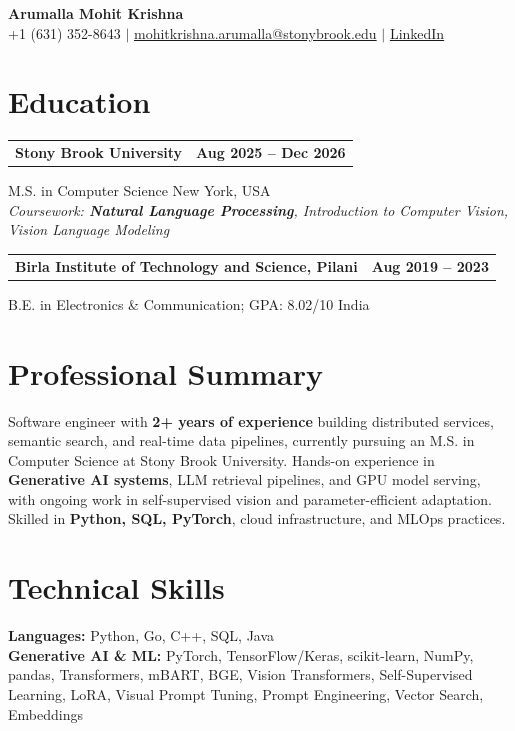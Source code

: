 \documentclass[letterpaper,10pt]{article}
\makeatletter
\newcommand{\entry}[2]{%
  \noindent
  \begin{tabularx}{\linewidth}
    {@{}>{\raggedright\arraybackslash}X@{\hspace{6pt}}r@{}}
    \textbf{#1} & #2
  \end{tabularx}\par
}
\makeatother
\begin{document}
\begin{center}
    {\LARGE\bfseries Arumalla Mohit Krishna}\\[3pt]
    +1 (631) 352-8643 $|$
    \href{mailto:mohitkrishna.arumalla@stonybrook.edu}
    {mohitkrishna.arumalla@stonybrook.edu} $|$
    \href{https://linkedin.com/in/mohit-krishna-arumalla}
    {LinkedIn}
\end{center}
\vspace{-8pt}

\section{Education}

\entry
  {\textbf{Stony Brook University}}
  {\textbf{Aug 2025 -- Dec 2026}}

M.S. in Computer Science \hfill New York, USA\\
\textit{
Coursework: \textbf{Natural Language Processing},
Introduction to Computer Vision, Vision Language Modeling
}
\vspace{3pt}

\entry
  {\textbf{Birla Institute of Technology and Science, Pilani}}
  {\textbf{Aug 2019 -- 2023}}

B.E. in Electronics \& Communication; GPA: 8.02/10 \hfill India
\section{Professional Summary}

Software engineer with \textbf{2+ years of experience} building distributed services,
semantic search, and real-time data pipelines, currently pursuing an M.S. in Computer
Science at Stony Brook University. Hands-on experience in \textbf{Generative AI systems}, LLM
retrieval pipelines, and GPU model serving, with ongoing work in self-supervised vision and
parameter-efficient adaptation. Skilled in \textbf{Python, SQL, PyTorch}, cloud infrastructure,
and MLOps practices.

\section{Technical Skills}

\textbf{Languages:}
Python, Go, C++, SQL, Java\\

\textbf{Generative AI \& ML:}
PyTorch, TensorFlow/Keras, scikit-learn, NumPy, pandas,
Transformers, mBART, BGE, Vision Transformers,
Self-Supervised Learning, LoRA, Visual Prompt Tuning,
Prompt Engineering, Vector Search, Embeddings\\
\end{document}
